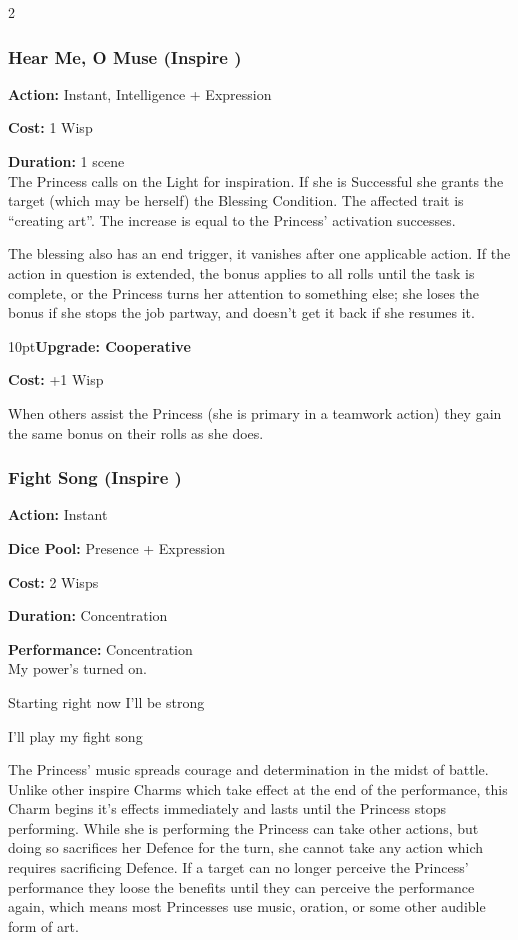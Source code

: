 \begin{multicols}{2}
\subsubsection*{Hear Me, O Muse (Inspire \textbullet)}

\noindent \textbf{Action:} Instant, Intelligence + Expression

\noindent \textbf{Cost:} 1 Wisp

\noindent \textbf{Duration:} 1 scene \\

\noindent The Princess calls on the Light for inspiration. If she is Successful she grants the target (which may be herself) the Blessing Condition. The affected trait is \textquotedblleft creating art\textquotedblright. The increase is equal to the Princess' activation successes. 

The blessing also has an end trigger, it vanishes after one applicable action. If the action in question is extended, the bonus applies to all rolls until the task is complete, or the Princess turns her attention to something else; she loses the bonus if she stops the job partway, and doesn't get it back if she resumes it.

\begin{myindentpar}{10pt}\textbf{Upgrade: Cooperative}

\noindent \textbf{Cost:} +1 Wisp

When others assist the Princess (she is primary in a teamwork action) they gain the same bonus on their rolls as she does.\end{myindentpar}

\subsubsection*{Fight Song (Inspire \textbullet)}

\noindent \textbf{Action:} Instant

\noindent \textbf{Dice Pool:} Presence + Expression

\noindent \textbf{Cost:} 2 Wisps

\noindent \textbf{Duration:} Concentration

\noindent \textbf{Performance:} Concentration\\

\noindent My power's turned on.

Starting right now I'll be strong

I'll play my fight song

The Princess' music spreads courage and determination in the midst of battle. Unlike other inspire Charms which take effect at the end of the performance, this Charm begins it's effects immediately and lasts until the Princess stops performing. While she is performing the Princess can take other actions, but doing so sacrifices her Defence for the turn, she cannot take any action which requires sacrificing Defence. If a target can no longer perceive the Princess' performance they loose the benefits until they can perceive the performance again, which means most Princesses use music, oration, or some other audible form of art. 


\end{multicols}
